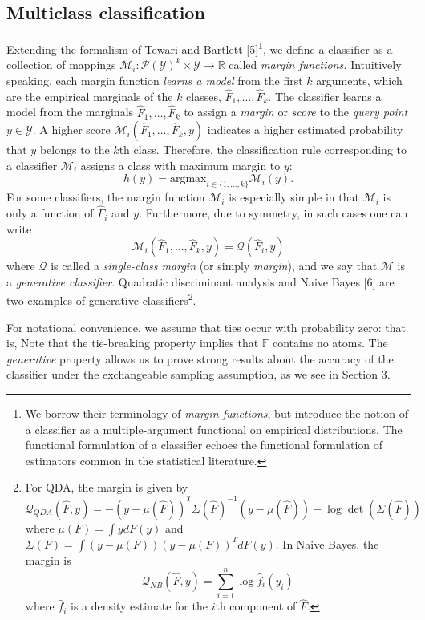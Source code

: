 \documentclass{article}
\newcommand{\argmax}{\text{argmax}}
\begin{document}
\subsection{Multiclass classification}

Extending the formalism of Tewari and Bartlett [5]\footnote{We borrow their terminology of \emph{margin functions}, but introduce the notion of a classifier as a multiple-argument functional on empirical distributions.  
The functional formulation of a classifier echoes the functional formulation of estimators common in the statistical literature.},
we define a classifier as a collection of mappings
$\mathcal{M}_i: \mathcal{P}(\mathcal{Y})^k \times \mathcal{Y} \to \mathbb{R}$ called \emph{margin functions.}
Intuitively speaking, each margin function \emph{learns a model} from the first $k$ arguments, which are
the empirical marginals of the $k$ classes, $\hat{F}_1,\hdots, \hat{F}_k$.  The classifier learns a model
from the marginals $\hat{F}_1,\hdots, \hat{F}_k$ to assign a \emph{margin} or \emph{score} to the
\emph{query point} $y \in \mathcal{Y}$.  A higher score $\mathcal{M}_i(\hat{F}_1,\hdots, \hat{F}_k, y)$ indicates a higher estimated probability that $y$ belongs to the $k$th class.  
Therefore, the classification rule corresponding to a classifier $\mathcal{M}_i$ assigns
a class with maximum margin to $y$:
\[
h(y) = \argmax_{i \in \{1,\hdots, k\}} \mathcal{M}_i(y).
\]
For some classifiers, the margin function $\mathcal{M}_i$ is especially simple
in that $\mathcal{M}_i$ is only a function of $\hat{F}_i$ and $y$.
Furthermore, due to symmetry, in such cases one can write
\[
\mathcal{M}_i(\hat{F}_1,\hdots, \hat{F}_k, y) = \mathcal{Q}(\hat{F}_i, y)
\]
where $\mathcal{Q}$ is called a \emph{single-class margin} (or simply \emph{margin}),
and we say that $\mathcal{M}$ is a \emph{generative classifier}.
Quadratic discriminant analysis and Naive Bayes [6] are two examples of
generative classifiers\footnote{For QDA, the margin is given by
\[
\mathcal{Q}_{QDA}(\hat{F}, y) = -(y - \mu(\hat{F}))^T \Sigma(\hat{F})^{-1} (y-\mu(\hat{F})) - \log\det(\Sigma(\hat{F}))
\]
where $\mu(F) = \int y dF(y)$ and $\Sigma(F) = \int (y-\mu(F))(y-\mu(F))^T dF(y)$.
In Naive Bayes, the margin is
\[
\mathcal{Q}_{NB}(\hat{F},  y) = \sum_{i=1}^n \log \hat{f}_i(y_i)
\]
where $\hat{f}_i$ is a density estimate for the $i$th component of
$\hat{F}$.}.


For notational convenience, we assume that ties occur with probability
zero: that is, Note that the tie-breaking property implies that $\mathbb{F}$ contains no atoms.
The \emph{generative} property allows us to prove strong results about the accuracy of the classifier
under the exchangeable sampling assumption, as we see in Section 3.
\end{document}
